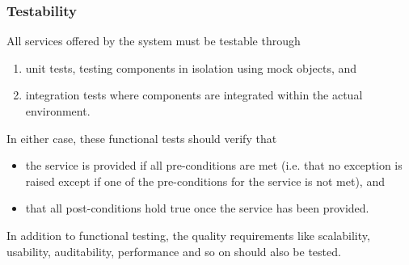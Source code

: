 \subsubsection{Testability}
All services offered by the system must be testable through
\begin{enumerate}
\item unit tests, testing components in isolation using mock objects, and
\item integration tests where components are integrated within the actual environment.
\end{enumerate}
In either case, these functional tests should verify that
\begin{itemize}
\item the service is provided if all pre-conditions are met (i.e. that no exception is raised except
if one of the pre-conditions for the service is not met), and
\item that all post-conditions hold true once the service has been provided.
\end{itemize}
In addition to functional testing, the quality requirements like scalability, usability, auditability,
performance and so on should also be tested.

